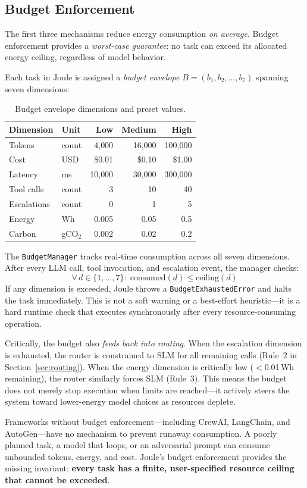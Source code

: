 \subsection{Budget Enforcement}
\label{sec:budget}

The first three mechanisms reduce energy consumption \emph{on average}. Budget enforcement provides a \emph{worst-case guarantee}: no task can exceed its allocated energy ceiling, regardless of model behavior.

Each task in Joule is assigned a \emph{budget envelope} $B = (b_1, b_2, \ldots, b_7)$ spanning seven dimensions:

\begin{table}[h]
\centering
\caption{Budget envelope dimensions and preset values.}
\label{tab:budget-presets}
\begin{tabular}{llrrr}
\toprule
Dimension & Unit & Low & Medium & High \\
\midrule
Tokens         & count  & 4{,}000   & 16{,}000  & 100{,}000 \\
Cost           & USD    & \$0.01    & \$0.10    & \$1.00    \\
Latency        & ms     & 10{,}000  & 30{,}000  & 300{,}000 \\
Tool calls     & count  & 3         & 10        & 40        \\
Escalations    & count  & 0         & 1         & 5         \\
Energy         & Wh     & 0.005     & 0.05      & 0.5       \\
Carbon         & gCO$_2$ & 0.002   & 0.02      & 0.2       \\
\bottomrule
\end{tabular}
\end{table}

The \texttt{BudgetManager} tracks real-time consumption across all seven dimensions. After every LLM call, tool invocation, and escalation event, the manager checks:
%
\[
  \forall\, d \in \{1, \ldots, 7\}:\; \text{consumed}(d) \leq \text{ceiling}(d)
\]
%
If any dimension is exceeded, Joule throws a \texttt{BudgetExhaustedError} and halts the task immediately. This is not a soft warning or a best-effort heuristic---it is a hard runtime check that executes synchronously after every resource-consuming operation.

Critically, the budget also \emph{feeds back into routing}. When the escalation dimension is exhausted, the router is constrained to SLM for all remaining calls (Rule~2 in Section~\ref{sec:routing}). When the energy dimension is critically low ($<$0.01\,Wh remaining), the router similarly forces SLM (Rule~3). This means the budget does not merely stop execution when limits are reached---it actively steers the system toward lower-energy model choices as resources deplete.

Frameworks without budget enforcement---including CrewAI, LangChain, and AutoGen---have no mechanism to prevent runaway consumption. A poorly planned task, a model that loops, or an adversarial prompt can consume unbounded tokens, energy, and cost. Joule's budget enforcement provides the missing invariant: \textbf{every task has a finite, user-specified resource ceiling that cannot be exceeded}.
